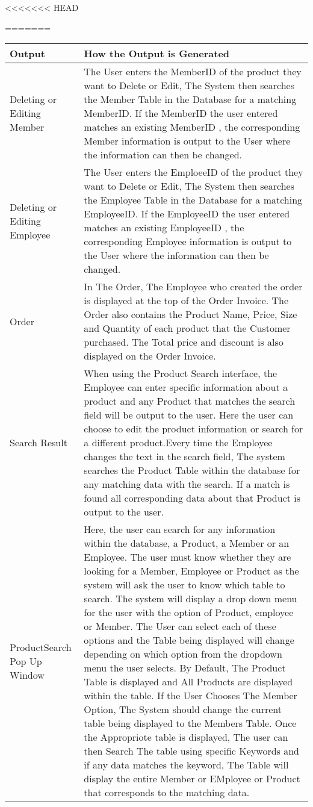 <<<<<<< HEAD

=======
  \begin{tabular}{|p{4cm}|p{4cm}|}
        \hline
	\textbf{Output} & \textbf{ How the Output is Generated}\\ \hline
	{ Deleting or Editing Member} & {The User enters the MemberID of the product they want to Delete or Edit, The System then searches the Member Table in the Database for a matching MemberID. If the MemberID the user entered matches an existing MemberID , the corresponding Member information is output to the User where the information can then be changed.}\\ \hline
	{Deleting or Editing Employee} & {The User enters the EmploeeID of the product they want to Delete or Edit, The System then searches the Employee Table in the Database for a matching EmployeeID. If the EmployeeID the user entered matches an existing EmployeeID , the corresponding Employee information is output to the User where the information can then be changed.}\\ \hline
	{Order}&{ In The Order, The Employee who created the order is displayed at the top of the Order Invoice. The Order also contains the Product Name, Price, Size and Quantity of each product that the Customer purchased. The Total price and discount is also displayed on the Order Invoice.} \\ \hline
	{Search Result}&{When using the Product Search interface, the Employee can enter specific information about a product and any Product that matches the search field will be output to the user. Here the user can choose to edit the product information or search for a different product.Every time the Employee changes the text in the search field, The system searches the Product Table within the database for any matching data with the search. If a match is found all corresponding data about that Product is output to the user.} \\ \hline
	{ProductSearch Pop Up Window} & {Here, the user can search for any information within the database, a Product, a Member or an Employee. The user must know whether they are looking for a Member, Employee or Product as the system will ask the user to know which table to search. The system will display a drop down menu for the user with the option of Product, employee or Member. The User can select each of these options and the Table being displayed will change depending on which option from the dropdown menu the user selects. By Default, The Product Table is displayed and All Products are displayed within the table. If the User Chooses The Member Option, The System should change the current table being displayed to the Members Table. Once the Appropriote table is displayed, The user can then Search The table using specific Keywords and if any data matches the keyword, The Table will display the entire Member or EMployee or Product that corresponds to the matching data.}\\ \hline
	\end{tabular}
	
